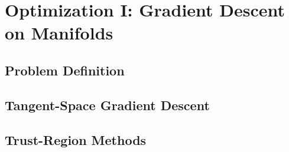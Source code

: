 
\chapter{Optimization I: Gradient Descent on Manifolds}

\section{Problem Definition}

\section{Tangent-Space Gradient Descent}

\section{Trust-Region Methods}
